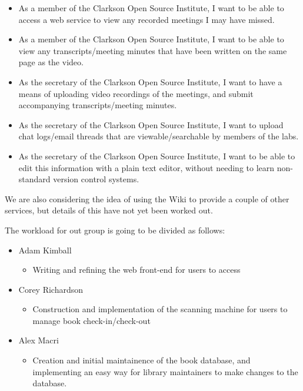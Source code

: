 \documentclass[a4paper, 10pt, oneside, draft]{article}
\begin{document}
\begin{itemize}
	\item As a member of the Clarkson Open Source Institute, I want to be able to access a web service to view any recorded meetings I may have missed.
	\item As a member of the Clarkson Open Source Institute, I want to be able to view any transcripts/meeting minutes that have been written on the same page as the video.
	\item As the secretary of the Clarkson Open Source Institute, I want to have a means of uploading video recordings of the meetings, and submit accompanying transcripts/meeting minutes.
	\item As the secretary of the Clarkson Open Source Institute, I want to upload chat logs/email threads that are viewable/searchable by members of the labs.
	\item As the secretary of the Clarkson Open Source Institute, I want to be able to edit this information with a plain text editor, without needing to learn non-standard version control systems.
\end{itemize}

We are also considering the idea of using the Wiki to provide a couple of other services, but details of this have not yet been worked out.

The workload for out group is going to be divided as follows:

\begin{itemize}
	\item Adam Kimball
		\begin{itemize}
 			\item Writing and refining the web front-end for users to access
		\end{itemize}
	\item Corey Richardson
		\begin{itemize}
			\item Construction and implementation of the scanning machine for users to manage
				book check-in/check-out
		\end{itemize}
	\item Alex Macri
		\begin{itemize}
			\item Creation and initial maintainence of the book database, and implementing
				an easy way for library maintainers to make changes to the database.
		\end{itemize}
\end{itemize}
\end{document}
